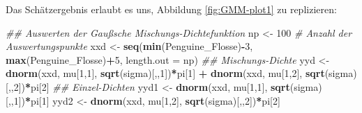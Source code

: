 \documentclass[
  ngerman,
]{book}
\newenvironment{Shaded}{\begin{snugshade}}{\end{snugshade}}
\newcommand{\CommentTok}[1]{\textcolor[rgb]{0.56,0.35,0.01}{\textit{#1}}}
\newcommand{\DataTypeTok}[1]{\textcolor[rgb]{0.13,0.29,0.53}{#1}}
\newcommand{\DecValTok}[1]{\textcolor[rgb]{0.00,0.00,0.81}{#1}}
\newcommand{\KeywordTok}[1]{\textcolor[rgb]{0.13,0.29,0.53}{\textbf{#1}}}
\newcommand{\NormalTok}[1]{#1}
\newcommand{\OperatorTok}[1]{\textcolor[rgb]{0.81,0.36,0.00}{\textbf{#1}}}
\newcommand{\StringTok}[1]{\textcolor[rgb]{0.31,0.60,0.02}{#1}}
\begin{document}
Das Schätzergebnis erlaubt es uns, Abbildung \ref{fig:GMM-plot1} zu replizieren:

\begin{Shaded}
\begin{Highlighting}[]
\CommentTok{## Auswerten der Gaußsche Mischungs-Dichtefunktion}
\NormalTok{np      <-}\StringTok{ }\DecValTok{100} \CommentTok{# Anzahl der Auswertungspunkte}
\NormalTok{xxd     <-}\StringTok{ }\KeywordTok{seq}\NormalTok{(}\KeywordTok{min}\NormalTok{(Penguine_Flosse)}\OperatorTok{-}\DecValTok{3}\NormalTok{, }\KeywordTok{max}\NormalTok{(Penguine_Flosse)}\OperatorTok{+}\DecValTok{5}\NormalTok{, }\DataTypeTok{length.out =}\NormalTok{ np)}
\CommentTok{## Mischungs-Dichte}
\NormalTok{yyd     <-}\StringTok{ }\KeywordTok{dnorm}\NormalTok{(xxd, mu[}\DecValTok{1}\NormalTok{,}\DecValTok{1}\NormalTok{], }\KeywordTok{sqrt}\NormalTok{(sigma)[,,}\DecValTok{1}\NormalTok{])}\OperatorTok{*}\NormalTok{pi[}\DecValTok{1}\NormalTok{] }\OperatorTok{+}
\StringTok{           }\KeywordTok{dnorm}\NormalTok{(xxd, mu[}\DecValTok{1}\NormalTok{,}\DecValTok{2}\NormalTok{], }\KeywordTok{sqrt}\NormalTok{(sigma)[,,}\DecValTok{2}\NormalTok{])}\OperatorTok{*}\NormalTok{pi[}\DecValTok{2}\NormalTok{]}
\CommentTok{## Einzel-Dichten}
\NormalTok{yyd1    <-}\StringTok{ }\KeywordTok{dnorm}\NormalTok{(xxd, mu[}\DecValTok{1}\NormalTok{,}\DecValTok{1}\NormalTok{], }\KeywordTok{sqrt}\NormalTok{(sigma)[,,}\DecValTok{1}\NormalTok{])}\OperatorTok{*}\NormalTok{pi[}\DecValTok{1}\NormalTok{]}
\NormalTok{yyd2    <-}\StringTok{ }\KeywordTok{dnorm}\NormalTok{(xxd, mu[}\DecValTok{1}\NormalTok{,}\DecValTok{2}\NormalTok{], }\KeywordTok{sqrt}\NormalTok{(sigma)[,,}\DecValTok{2}\NormalTok{])}\OperatorTok{*}\NormalTok{pi[}\DecValTok{2}\NormalTok{]}


\end{Highlighting}
\end{Shaded}
\end{document}
